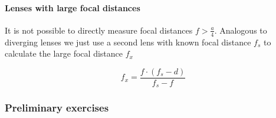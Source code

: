 \documentclass{scrreprt}
\begin{document}
\paragraph{Lenses with large focal distances}
It is not possible to directly measure focal distances $f > \frac{a}{4}$. Analogous to diverging lenses we just use a second lens with known focal distance $f_s$ to calculate the large focal distance $f_x$

\begin{equation}
f_x = \frac{f \cdot \left( f_s - d\right)}{f_s - f}
\label{lenssystem2}
\end{equation}

\subsubsection{Preliminary exercises}
\end{document}
